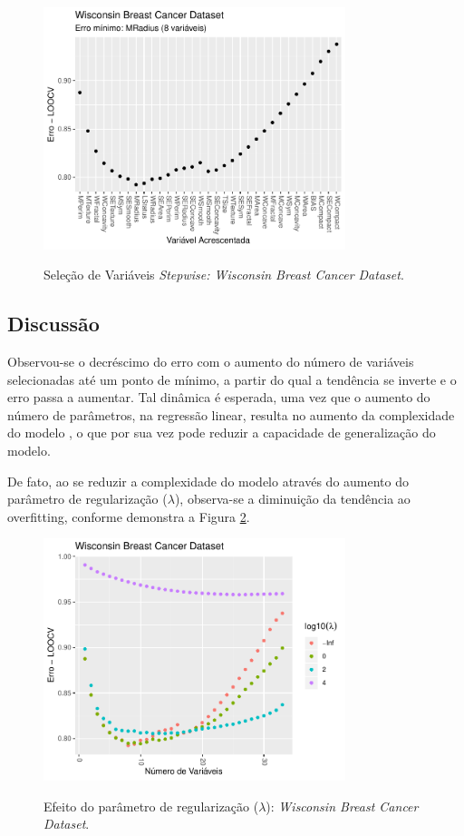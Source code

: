 \begin{figure}[!htb]
    \centering
    \caption{Seleção de Variáveis \textit{Stepwise: Wisconsin Breast Cancer Dataset}.}
    \includegraphics[height=200pt]{imgs/res/WisconsinBreastCancerDataset_validation}
    \label{fig:stepwise_WisconsinBreastCancer}
\end{figure}
\FloatBarrier

\subsection{Discussão}
Observou-se o decréscimo do erro com o aumento do número de variáveis selecionadas até um ponto de mínimo, a partir do qual a tendência se inverte e o erro passa a aumentar. Tal dinâmica é esperada, uma vez que o aumento do número de parâmetros, na regressão linear, resulta no aumento da complexidade do modelo \cite[p. 224]{statistical_learning}, o que por sua vez pode reduzir a capacidade de generalização do modelo. 

De fato, ao se reduzir a complexidade do modelo através do aumento do parâmetro de regularização ($\lambda$), observa-se a diminuição da tendência ao overfitting, conforme demonstra a Figura \ref{fig:lambda_WisconsinBreastCancer}.

\begin{figure}[!htb]
    \centering
    \caption{Efeito do parâmetro de regularização ($\lambda$): \textit{Wisconsin Breast Cancer Dataset}.}
    \includegraphics[height=200pt]{imgs/res/WisconsinBreastCancerDataset_lambda}
    \label{fig:lambda_WisconsinBreastCancer}
\end{figure}


